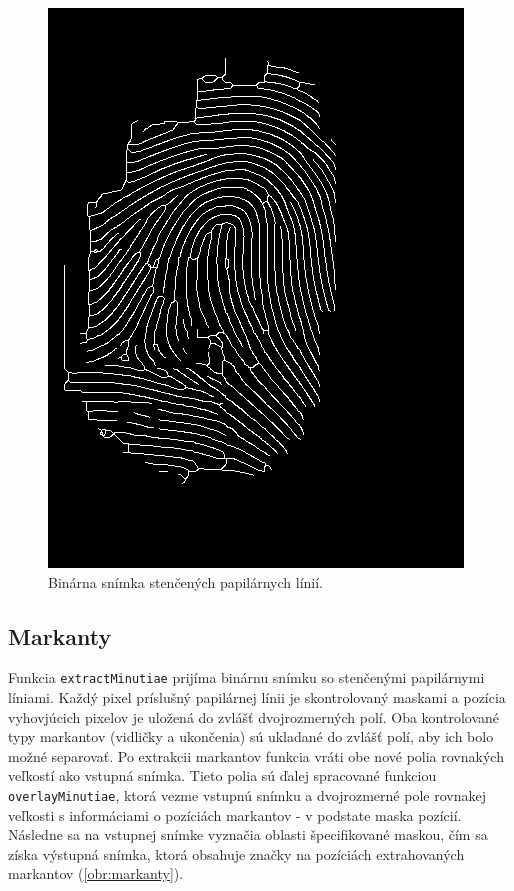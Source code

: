   \begin{figure}[h]
    \centering
    \includegraphics[width=0.3\linewidth]{obrazky-figures/thinned.png}
    \caption{Binárna snímka stenčených papilárnych línií.}
    \label{obr:stencene}
  \end{figure}

  \subsection{Markanty}
  Funkcia \texttt{extractMinutiae} prijíma binárnu snímku so stenčenými papilárnymi líniami. Každý pixel príslušný papilárnej línii je skontrolovaný
  maskami a pozícia vyhovjúcich pixelov je uložená do zvlášť dvojrozmerných polí. Oba kontrolované typy markantov (vidličky a ukončenia) sú ukladané do
  zvlášť polí, aby ich bolo možné separovať. Po extrakcii markantov funkcia vráti obe nové polia rovnakých veľkostí ako vstupná snímka. Tieto polia sú ďalej
  spracované funkciou \texttt{overlayMinutiae}, ktorá vezme vstupnú snímku a dvojrozmerné pole rovnakej veľkosti s informáciami o pozíciách markantov -
  v podstate maska pozícií. Následne sa na vstupnej snímke vyznačia oblasti špecifikované maskou, čím sa získa výstupná snímka, ktorá obsahuje značky na
  pozíciách extrahovaných markantov (\ref{obr:markanty}).

